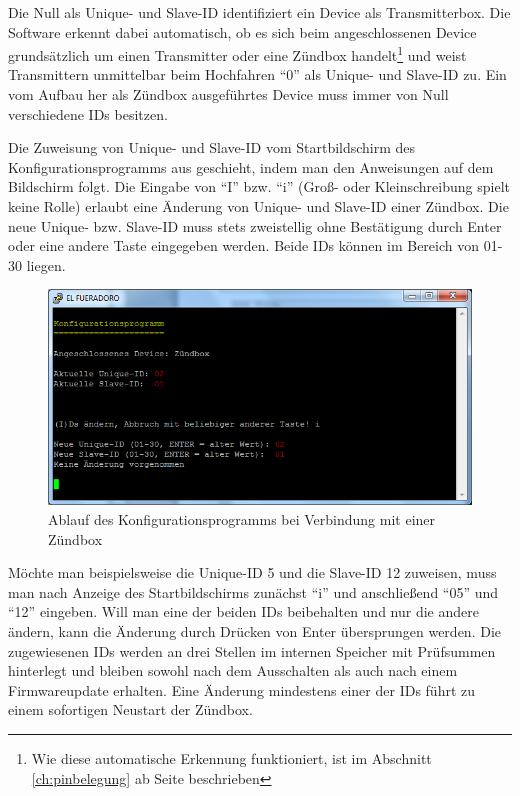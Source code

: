 \documentclass[pdftex, parskip, numbers=noenddot, toc=listof]{scrbook}
\begin{document}
					Die Null als Unique- und Slave-ID identifiziert ein Device als Transmitterbox. Die Software erkennt dabei automatisch, ob es sich beim angeschlossenen Device grundsätzlich um einen Transmitter oder eine Zündbox handelt\footnote{Wie diese automatische Erkennung funktioniert, ist im Abschnitt \ref{ch:pinbelegung} ab Seite \pageref{ch:pinbelegung} beschrieben} und weist Transmittern unmittelbar beim Hochfahren \enquote{0} als Unique- und Slave-ID zu. Ein vom Aufbau her als Zündbox ausgeführtes Device muss immer von Null verschiedene IDs besitzen.

					Die Zuweisung von Unique- und Slave-ID vom Startbildschirm des Konfigurationsprogramms aus geschieht, indem man den Anweisungen auf dem Bildschirm folgt. Die Eingabe von \enquote{I} bzw. \enquote{i} (Groß- oder Kleinschreibung spielt keine Rolle) erlaubt eine Änderung von Unique- und Slave-ID einer Zündbox. Die neue Unique- bzw. Slave-ID muss stets zweistellig ohne Bestätigung durch Enter oder eine andere Taste eingegeben werden. Beide IDs können im Bereich von 01-30 liegen.

					\begin{figure}
						\centering
						\includegraphics[width=.8\textwidth]{Bilder/conf}
						\caption{Ablauf des Konfigurationsprogramms bei Verbindung mit einer Zündbox}
						\label{fig:conf}
					\end{figure}

					Möchte man beispielsweise die Unique-ID 5 und die Slave-ID 12 zuweisen, muss man nach Anzeige des Startbildschirms zunächst \enquote{i} und anschließend \enquote{05} und \enquote{12} eingeben. Will man eine der beiden IDs beibehalten und nur die andere ändern, kann die Änderung durch Drücken von Enter übersprungen werden. Die zugewiesenen IDs werden an drei Stellen im internen Speicher mit Prüfsummen hinterlegt und bleiben sowohl nach dem Ausschalten als auch nach einem Firmwareupdate erhalten. Eine Änderung mindestens einer der IDs führt zu einem sofortigen Neustart der Zündbox.
\end{document}

